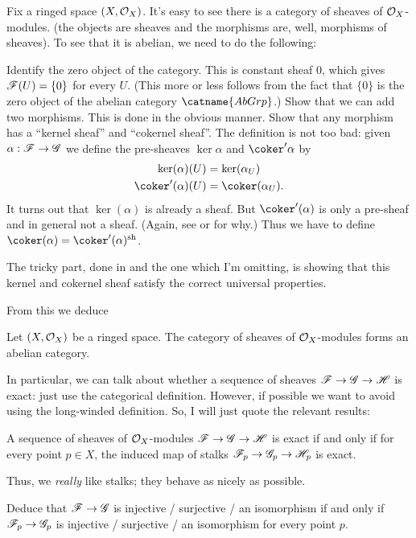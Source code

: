 \documentclass[11pt]{scrreprt}
\begin{document}
Fix a ringed space $(X, \mathcal O_X)$.
It's easy to see there is a category of sheaves of $\mathcal O_X$-modules.
(the objects are sheaves and the morphisms are, well, morphisms of sheaves).
To see that it is abelian, we need to do the following:
\begin{itemize}
	\ii Identify the zero object of the category.
	This is constant sheaf $0$, which gives $\mathscr F(U) = \{0\}$ for every $U$.
	(This more or less follows from the fact that $\{0\}$
	is the zero object of the abelian category $\catname{AbGrp}$.)
	\ii Show that we can add two morphisms.
	This is done in the obvious manner.
	\ii Show that any morphism has a ``kernel sheaf'' and ``cokernel sheaf''.
	The definition is not too bad: given $\alpha : \mathscr F \to \mathscr G$ we define the
	pre-sheaves $\ker\alpha$ and $\coker'\alpha$ by
	\begin{align*}
		\ker(\alpha)(U) &= \ker(\alpha_U) \\
		\coker'(\alpha)(U) &= \coker(\alpha_U).
	\end{align*}
	It turns out that $\ker(\alpha)$ is already a sheaf.
	But $\coker'(\alpha)$ is only a pre-sheaf and in general not a sheaf.
	(Again, see \cite{ref:vakil} or \cite{ref:gathmann} for why.)
	Thus we have to define $\coker(\alpha) = \coker'(\alpha) \sh$.
	
	The tricky part, done in \cite{ref:vakil} and the one which I'm omitting,
	is showing that this kernel and cokernel sheaf satisfy
	the correct universal properties.
\end{itemize}

From this we deduce
\begin{theorem}
	Let $(X, \mathcal O_X)$ be a ringed space.
	The category of sheaves of $\mathcal O_X$-modules forms an abelian category.
\end{theorem}

In particular, we can talk about whether a sequence of sheaves
$\mathscr F \to \mathscr G \to \mathscr H$ is exact: just use the categorical definition.
However, if possible we want to avoid using the long-winded definition.
So, I will just quote the relevant results:
\begin{theorem}
	A sequence of sheaves of $\mathcal O_X$-modules
	$\mathscr F \to \mathscr G \to \mathscr H$ is exact if and only if
	for every point $p \in X$,
	the induced map of stalks $\mathscr F_p \to \mathscr G_p \to \mathscr H_p$ is exact.
\end{theorem}
Thus, we \emph{really} like stalks; they behave as nicely as possible.
\begin{ques}
	Deduce that $\mathscr F \to \mathscr G$ is injective / surjective / an isomorphism
	if and only if $\mathscr F_p \to \mathscr G_p$ is injective / surjective / an isomorphism
	for every point $p$.
\end{ques}
\end{document}
